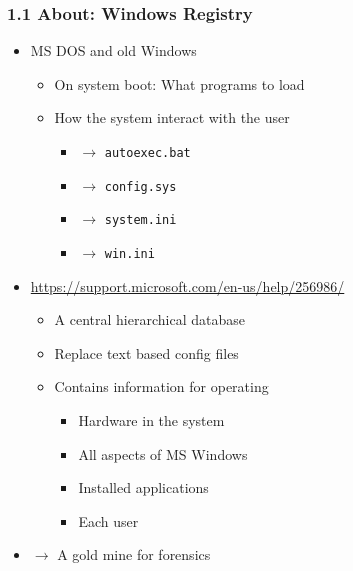 \begin{frame}[fragile]
  \frametitle{1.1 About: Windows Registry}
    \begin{itemize}
        \item MS DOS and old Windows
            \begin{itemize}
                \item On system boot: What programs to load
                \item How the system interact with the user
                \begin{itemize}
			\item[] $\to$ \texttt{autoexec.bat}
			\item[] $\to$ \texttt{config.sys}
			\item[] $\to$ \texttt{system.ini}
			\item[] $\to$ \texttt{win.ini}
                \end{itemize}
            \end{itemize}
        \item \url{https://support.microsoft.com/en-us/help/256986/}
            \begin{itemize}
                \item A central hierarchical database
                \item Replace text based config files
                \item Contains information for operating
                \begin{itemize}
                    \item Hardware in the system
                    \item All aspects of MS Windows
                    \item Installed applications
                    \item Each user
                \end{itemize}
            \end{itemize}
    \item[] $\to$ A gold mine for forensics
    \end{itemize}
\end{frame}



